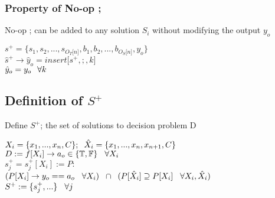 \documentclass[11pt]{article}
\begin{document}
\subsubsection{Property of No-op ;}
No-op ; can be added to any solution $S_i$ without modifying the output $y_o$
\begin{center}
$
s^+ = \{ s_1,s_2,...,s_{O_T \lbrack n \rbrack }, b_1, b_2,...,b_{O_S \lbrack n \rbrack},y_o\}
$
\\ \vspace{2mm}
$
\hat{s}^+ \rightarrow \hat{y}_o = insert \lbrack s^+,;,k \rbrack
$
\\ \vspace{2mm}
$
\hat{y}_o = y_o \hspace{2.5mm} \forall k
$
\end{center}





\subsection{Definition of $S^+$}
Define $S^+$; the set of solutions to decision problem D
\begin{center}
$
X_i = \{x_1,...,x_n,C\}; \hspace{2mm} \hat{X}_i = \{x_1,...,x_n,x_{n+1},C\}
$
\\ \vspace{2mm}
$
D := f \lbrack X_i \rbrack \rightarrow a_{o} \in \{\mathbb{T}, \mathbb{F}\} \hspace{3mm} \forall X_i
$
\\ \vspace{2mm}
$
s_j^+ = s_j^+[X_i] := P :
$
\\ \vspace{2mm}
$
(P \lbrack X_i \rbrack \rightarrow y_{o} == a_{o} \hspace{3mm} \forall X_i) \hspace{2mm} \cap \hspace{2mm} (P[\hat{X}_i] \supseteq P[X_i] \hspace{3mm} \forall X_i,\hat{X}_i)
$
\\ \vspace{2mm}
$
S^+ := \{s^+_j,...\} \hspace{3mm} \forall j
$
\end{center}
\end{document}
